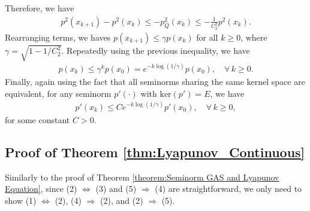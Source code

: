 \documentclass[11 pt]{article}
\begin{document}
\begin{itemize}
		Therefore, we have
		\begin{align*}
			p^2(x_{k+1}) - p^2(x_k)\leq -p_{Q}^2(x_k)\leq -\frac{1}{C_2^2}p^2(x_k).
		\end{align*}
		Rearranging terms, we haves $p(x_{k+1})\leq \gamma p(x_k)$ for all $k\geq 0$, where $\gamma=\sqrt{1-1/C_2^2}$. Repeatedly using the previous inequality, we have
		\begin{align*}
			p(x_k)\leq \gamma^k p(x_0)=e^{-k\log(1/\gamma)}p(x_0),\quad \forall\,k\geq 0.
		\end{align*}
		Finally, again using the fact that all seminorms sharing the same kernel space are equivalent, for any seminorm $p'(\cdot)$ with $\text{ker}(p')=E$, we have 
		\begin{align*}
			p'(x_k)\leq C e^{-k\log(1/\gamma)}p'(x_0),\quad \forall\,k\geq 0,
		\end{align*}
		for some constant $C>0$.
	\end{itemize}
	
	
	
	
	\subsection{Proof of Theorem \ref{thm:Lyapunov_Continuous}}\label{pf:thm:Lyapunov_Continuous}
	
	Similarly to the proof of Theorem \ref{theorem:Seminorm GAS and Lyapunov Equation}, since (2) $\Leftrightarrow$ (3) and (5) $\Rightarrow$ (4) are straightforward, we only need to show (1) $\Leftrightarrow$ (2), (4) $\Rightarrow$ (2), and (2) $\Rightarrow$ (5).
	
\end{document}
